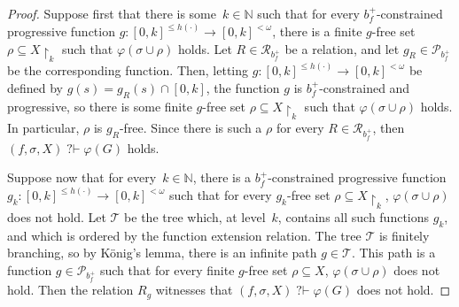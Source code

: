\documentclass{article}
\def\P{\mathcal{P}}
\newcommand{\uh}{\upharpoonright}
\newcommand{\qvdash}{\operatorname{{?}{\vdash}}}
\newcommand{\NN}[0]{\mathbb{N}}
\newcommand{\R}{\mathcal{R}}
\newcommand{\T}{\mathcal{T}}
\begin{document}
\begin{proof}
Suppose first that there is some~$k \in \NN$ such that for every $b_f^{+}$-constrained progressive function $g : [0, k]^{\leq h(\cdot)} \to [0, k]^{<\omega}$, there is a finite $g$-free set $\rho \subseteq X \uh_k$ such that $\varphi(\sigma \cup \rho)$ holds. Let $R \in \R_{b_f^+}$ be a relation,
and let $g_R \in \P_{b_f^+}$ be the corresponding function. Then, letting $g : [0, k]^{\leq h(\cdot)} \to [0, k]^{<\omega}$ be defined by $g(s) = g_R(s) \cap [0, k]$, the function $g$ is $b_f^{+}$-constrained and progressive, so there is some finite $g$-free set $\rho \subseteq X \uh_k$ such that $\varphi(\sigma \cup \rho)$ holds. In particular, $\rho$ is $g_R$-free. Since there is such a $\rho$ for every $R \in \R_{b_f^+}$, then $(f, \sigma, X) \qvdash \varphi(G)$ holds.

Suppose now that for every~$k \in \NN$, there is a $b_f^{+}$-constrained progressive function $g_k : [0, k]^{\leq h(\cdot)} \to [0, k]^{<\omega}$ such that for every $g_k$-free set $\rho \subseteq X \uh_k$, $\varphi(\sigma \cup \rho)$ does not hold. Let $\T$ be the tree which, at level~$k$, contains all such functions $g_k$, and which is ordered by the function extension relation. The tree $\T$ is finitely branching, so by K\"onig's lemma, there is an infinite path $g \in \T$. This path is a function $g \in \P_{b_f^+}$ such that for every finite $g$-free set $\rho \subseteq X$, $\varphi(\sigma \cup \rho)$ does not hold. Then the relation $R_g$ witnesses that $(f, \sigma, X) \qvdash \varphi(G)$ does not hold.
\end{proof}
\end{document}
